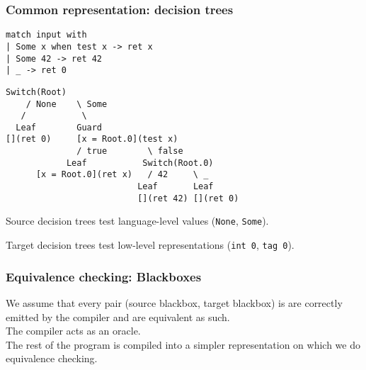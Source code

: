 \documentclass{beamer}
\begin{document}
\begin{frame}[fragile]
  \frametitle{Common representation: decision trees}
\begin{lstlisting}
match input with
| Some x when test x -> ret x
| Some 42 -> ret 42
| _ -> ret 0
\end{lstlisting}

\vfill\pause

\begin{lstlisting}[columns=fixed]
    Switch(Root)
    / None    \ Some
   /           \
  Leaf        Guard
[](ret 0)     [x = Root.0](test x)
              / true        \ false
            Leaf           Switch(Root.0)
      [x = Root.0](ret x)   / 42     \ _
                          Leaf       Leaf
                          [](ret 42) [](ret 0)
\end{lstlisting}

\vfill\pause

Source decision trees test language-level values (\texttt{None}, \texttt{Some}).

Target decision trees test low-level representations (\texttt{int 0}, \texttt{tag 0}).
\end{frame}

\begin{frame}
  \frametitle{Equivalence checking: Blackboxes}
  We assume that every pair (source blackbox, target blackbox) is are correctly emitted
  by the compiler and are equivalent as such. \\
  The compiler acts as an oracle. \\
  The rest of the program is compiled into a simpler representation on which we do equivalence checking. 

\end{frame}
\end{document}
